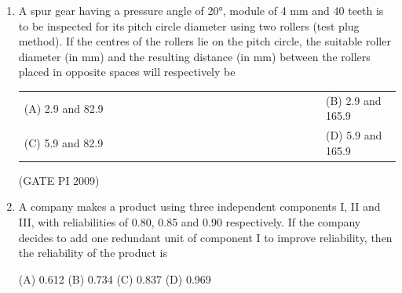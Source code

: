 \documentclass[journal,12pt,onecolumn]{IEEEtran}
\theoremstyle{remark}
\begin{document}
\begin{enumerate}[label=Q.\arabic*, leftmargin=*]
\begin{multicols}{2}
\begin{enumerate}[label=(\Alph*)]
    \item P-4, Q-3, R-1, S-2
    \item P-1, Q-2, R-3, S-4
    \item P-1, Q-4, R-3, S-2
    \item P-4, Q-3, R-2, S-1
\end{enumerate}
\end{multicols}
\hfill (GATE PI 2009)
\item A spur gear having a pressure angle of 20°, module of 4 mm and 40 teeth is to be inspected for its pitch circle diameter using two rollers (test plug method). If the centres of the rollers lie on the pitch circle, the suitable roller diameter (in mm) and the resulting distance (in mm) between the rollers placed in opposite spaces will respectively be
\begin{multicols}{2}
\begin{tabular}[t]{p{0.8\linewidth} p{0.9\linewidth}}
(A) 2.9 and 82.9 & (B) 2.9 and 165.9 \\
(C) 5.9 and 82.9 & (D) 5.9 and 165.9 \\
\end{tabular}
\end{multicols}
\hfill (GATE PI 2009)
\item A company makes a product using three independent components I, II and III, with reliabilities of 0.80, 0.85 and 0.90 respectively. If the company decides to add one redundant unit of component I to improve reliability, then the reliability of the product is

(A) 0.612 \hfill (B) 0.734 \hfill (C) 0.837 \hfill (D) 0.969 \\


\end{enumerate}
\end{document}
